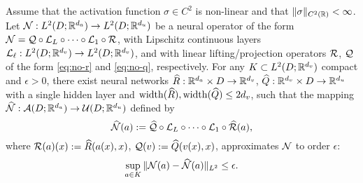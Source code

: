 \documentclass[reqno,a4paper]{amsart}
\begin{document}
\begin{lemma} \label{lem:linear-to-nonlinear}
Assume that the activation function $\sigma \in C^2$ is non-linear and that $\Vert \sigma \Vert_{C^2(\mathbb{R})} < \infty$. Let $\mathcal{N}: L^2(D;\mathbb{R}^{d_a}) \to L^2(D;\mathbb{R}^{d_u})$ be a neural operator of the form $\mathcal{N} = \mathcal{Q} \circ \mathcal{L}_{L}\circ \dots \circ \mathcal{L}_{1} \circ \mathcal{R}$, with Lipschitz continuous layers $\mathcal{L}_{\ell}: L^2(D;\mathbb{R}^{d_v}) \to L^2(D;\mathbb{R}^{d_v})$, and with linear lifting/projection operators $\mathcal{R}$, $\mathcal{Q}$ of the form \eqref{eq:no-r} and \eqref{eq:no-q}, respectively. For any $K\subset L^2(D;\mathbb{R}^{d_v})$ compact and $\epsilon > 0$, there exist neural networks $\widehat{R}: \mathbb{R}^{d_a}\times D \to \mathbb{R}^{d_v}$, $\widehat{Q}: \mathbb{R}^{d_v}\times D \to \mathbb{R}^{d_u}$ with a single hidden layer and $\mathrm{width}(\widehat{R}), \mathrm{width}(\widehat{Q}) \le 2d_v$, such that the mapping $\widehat{\mathcal{N}}: \mathcal{A}(D;\mathbb{R}^{d_a}) \to \mathcal{U}(D;\mathbb{R}^{d_u})$ defined by
\[
\widehat{\mathcal{N}}(a) := \widehat{\mathcal{Q}} \circ \mathcal{L}_{L} \circ \dots \circ \mathcal{L}_{1} \circ \widehat{\mathcal{R}}(a),
\]
where $\mathcal{R}(a)(x) := \widehat{R}(a(x),x)$, $\mathcal{Q}(v) := \widehat{Q}(v(x),x)$, approximates $\mathcal{N}$ to order $\epsilon$:
\[
\sup_{a\in K} 
\Vert 
\mathcal{N}(a) - \widehat{\mathcal{N}}(a)
\Vert_{L^2}
\le \epsilon.
\]
\end{lemma}
\end{document}
